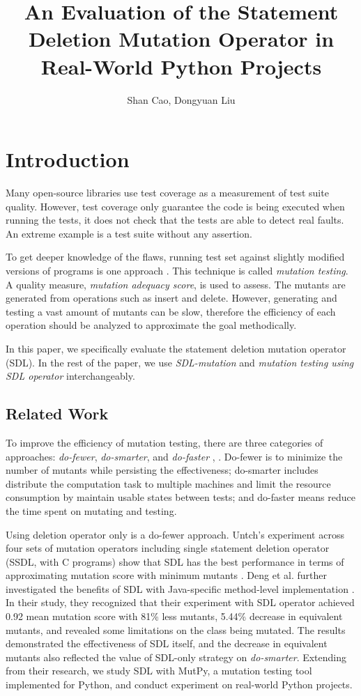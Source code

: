 \documentclass[12pt]{article}
\title{\textbf{An Evaluation of the Statement Deletion Mutation Operator in Real-World Python Projects}}
\author{Shan Cao, Dongyuan Liu}
\begin{document}
\maketitle
\tableofcontents

\section{Introduction}

Many open-source libraries use test coverage as a measurement of test suite quality. However, test coverage only guarantee the code is being executed when running the tests, it does not check that the tests are able to detect real faults. An extreme example is a test suite without any assertion.

To get deeper knowledge of the flaws, running test set against slightly modified versions of programs is one approach \cite{demillo1978hints}. This technique is called \emph{mutation testing}. A quality measure, \emph{mutation adequacy score}, is used to assess. The mutants are generated from operations such as insert and delete. However, generating and testing a vast amount of mutants can be slow, therefore the efficiency of each operation should be analyzed to approximate the goal methodically.

In this paper, we specifically evaluate the statement deletion mutation operator (SDL). In the rest of the paper, we use \emph{SDL-mutation} and \emph{mutation testing using SDL operator} interchangeably.

\subsection{Related Work}

To improve the efficiency of mutation testing, there are three categories of approaches: \emph{do-fewer}, \emph{do-smarter}, and \emph{do-faster} \cite{untch1995schema}, \cite{offutt2001mutation}. Do-fewer is to minimize the number of mutants while persisting the effectiveness; do-smarter includes distribute the computation task to multiple machines and limit the resource consumption by maintain usable states between tests; and do-faster means reduce the time spent on mutating and testing.

Using deletion operator only is a do-fewer approach. Untch's experiment across four sets of mutation operators including single statement deletion operator (SSDL, with C programs) show that SDL has the best performance in terms of approximating mutation score with minimum mutants \cite{untch2009reduced}. Deng et al. further investigated the benefits of SDL with Java-specific method-level implementation \cite{deng2013empirical}. In their study, they recognized that their experiment with SDL operator achieved 0.92 mean mutation score with 81\% less mutants, 5.44\% decrease in equivalent mutants, and revealed some limitations on the class being mutated. The results demonstrated the effectiveness of SDL itself, and the decrease in equivalent mutants also reflected the value of SDL-only strategy on \emph{do-smarter}. Extending from their research, we study SDL with MutPy, a mutation testing tool implemented for Python, and conduct experiment on real-world Python projects.
\end{document}
